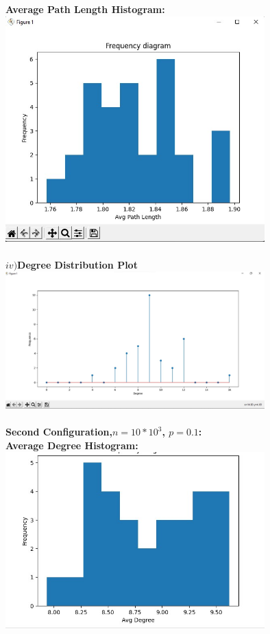 \documentclass[answers]{exam}
\begin{document}
\begin{questions}
\begin{framed}
\textbf{Average Path Length Histogram:}\\\includegraphics[width=10cm]{Average Path Length.jpg}\\\\\textbf{$iv) $Degree Distribution Plot}\\ \includegraphics[width=10cm]{deg distribution 1.jpg}\\\\
\newline
\textbf{Second Configuration,$n=10*10^3$, $p=0.1$:} \\\textbf{Average Degree Histogram:} \\ \includegraphics[width=10cm]{avg degree 2.jpg}\\

\end{framed}
\end{questions}
\end{document}
